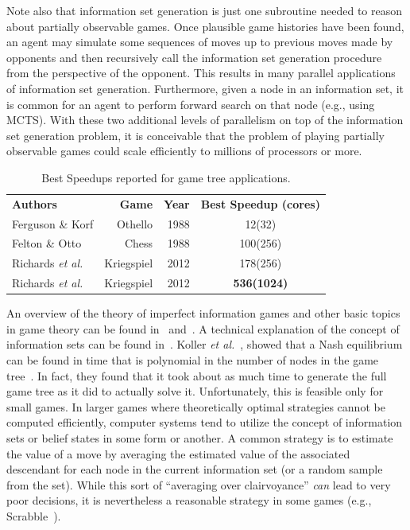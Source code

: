 \documentclass[times, 10pt,twocolumn]{article}
\newcommand{\etal}{{\em et al.}\ }
\begin{document}
Note also that information set generation is just one subroutine needed to reason about partially observable games.  Once plausible game histories have been found, an agent may simulate some sequences of moves up to previous moves made by opponents and then recursively call the information set generation procedure from the perspective of the opponent.  This results in many parallel applications of information set generation. Furthermore, given a node in an information set, it is common for an agent to perform forward search on that node (e.g., using MCTS).  With these two additional levels of parallelism on top of the information set generation problem, it is conceivable that the problem of playing partially observable games could scale efficiently to millions of processors or more.
\begin{table}[tphb]
\centering
\begin{tabular}{lrrc}
{\bf Authors} & {\bf Game} & {\bf Year} & {\bf Best Speedup (cores)} \\
Ferguson \& Korf & Othello & 1988 & 12(32) \\
Felton \& Otto & Chess & 1988 & 100(256) \\
Richards \etal & Kriegspiel & 2012 & 178(256) \\
Richards \etal & Kriegspiel & 2012 & {\bf 536(1024)} \\
\end{tabular}
\caption{Best Speedups reported for game tree applications.}
\vspace{-0.2in}
\label{bestspeedups}
\end{table}

An overview of the theory of imperfect information games and other basic topics in game theory can be found
in~\cite{kuhn03lectures} and~\cite{kuhn97classics}.  A technical explanation of the concept of information sets can be
found in~\cite{gilpin07algorithms}.  Koller \etal, showed that a Nash
equilibrium can be found in time that is polynomial in the number of nodes in the game tree~\cite{koller94fast}.  In fact, they found
that it took about as much time to generate the full game tree as it did to actually solve it.  Unfortunately, this is
feasible only for small games.  In larger games where theoretically optimal strategies cannot be computed efficiently,
computer systems tend to utilize the concept of information sets or belief states in some form or another.  A common
strategy is to estimate the value of a move by averaging the estimated value of the associated descendant for each node
in the current information set (or a random sample from the set).  While this sort of ``averaging over clairvoyance''
{\em can} lead to very poor decisions, it is nevertheless a reasonable strategy in some games (e.g.,
Scrabble~\cite{sheppard02world}).
\end{document}
